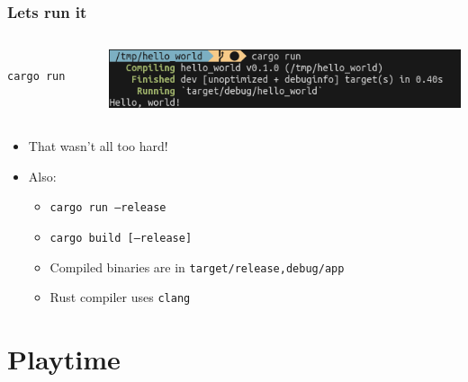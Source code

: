 \documentclass[aspectratio=169]{beamer}
\begin{document}
\begin{frame}[fragile]
  \frametitle{Lets run it}
  \begin{columns}
    \begin{column}{.5\linewidth}
      \begin{verbatim}
        cargo run
      \end{verbatim}
    \end{column}

    \begin{column}{.6\linewidth}
      \includegraphics[width=.8\linewidth]{figs/screenshots/presentation-20190612-111656}
    \end{column}
  \end{columns}

  \vspace{1cm}

  \begin{itemize}
  \item That wasn't all too hard!
  \item Also:
    \begin{itemize}
    \item \texttt{cargo run --release}
    \item \texttt{cargo build [--release]}
    \item Compiled binaries are in \texttt{target/{release,debug}/{app}}
    \item Rust compiler uses \texttt{clang}
    \end{itemize}
  \end{itemize}
\end{frame}

\section{Playtime}
\frame{\sectionpage}
\end{document}
